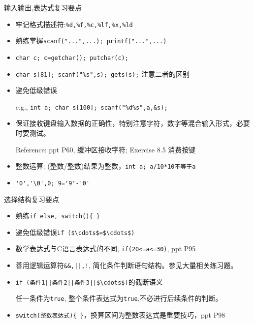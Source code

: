 
\begin{frame}[fragile]{输入输出,表达式复习要点}
\begin{itemize}
	\item 牢记格式描述符:\lstinline|%d,%f,%c,%lf,%x,%ld|
	\item 熟练掌握\lstinline|scanf("...",...); printf("...",...)|
	\item \lstinline|char c; c=getchar(); putchar(c);|
	\item \lstinline|char s[81]; scanf("%s",s); gets(s);| 注意二者的区别
	\item 避免低级错误
	
	e.g., \lstinline|int a; char s[100]; scanf("%d%s",a,&s);|
	
	\item 保证接收键盘输入数据的正确性，特别注意字符，数字等混合输入形式，必要时要测试。
	
	Reference: ppt P60, 缓冲区接收字符;  Exercise 8.5 消费按键
	
	\item 整数运算: (整数/整数)结果为整数，\lstinline|int a; a/10*10不等于a|
	\item \lstinline|'0','\0',0; 9='9'-'0'|
\end{itemize}
\end{frame}

\begin{frame}[fragile]{选择结构复习要点}
\begin{itemize}
	\item 熟练\lstinline|if else, switch(){ }|
	\item 避免低级错误\lstinline|if ($\cdots$=$\cdots$)|
	\item 数学表达式与C语言表达式的不同, \lstinline|if(20<=a<=30)|, ppt P95
	\item 善用逻辑运算符\lstinline$&&,||,!$, 简化条件判断语句结构。参见大量相关练习题。
	\item \lstinline!if (条件1||条件2||条件3||$\cdots$)!的截断语义
	
	任一条件为\lstinline|true|, 整个条件表达式为\lstinline|true|,不必进行后续条件的判断。
	\item \lstinline|switch(整数表达式){ }|，换算区间为整数表达式是重要技巧，ppt P98
\end{itemize}
\end{frame}

